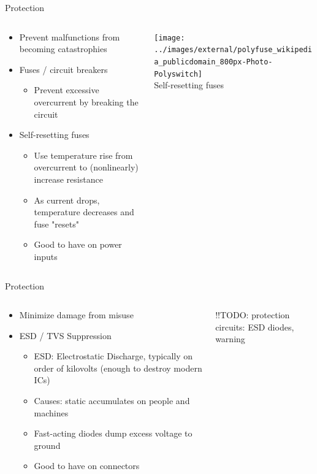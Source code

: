 \documentclass{beamer}
\begin{document}
\begin{frame}{Protection}
  \begin{columns}[T]
    \begin{column}{.6\textwidth}
      \begin{itemize}
        \item Prevent malfunctions from becoming catastrophies
        \item Fuses / circuit breakers
        \begin{itemize}
          \item Prevent excessive overcurrent by breaking the circuit
        \end{itemize}
        \item Self-resetting fuses
        \begin{itemize}
          \item Use temperature rise from overcurrent to (nonlinearly) increase resistance
          \item As current drops, temperature decreases and fuse "resets"
          \item Good to have on power inputs
        \end{itemize}
      \end{itemize}
    \end{column}

    \begin{column}{0.4\textwidth} \centering
      \texttt{[image: ../images/external/polyfuse\_wikipedia\_publicdomain\_800px-Photo-Polyswitch]} \\
      Self-resetting fuses \\
    \end{column}
  \end{columns}
\end{frame}

\begin{frame}{Protection}
  \begin{columns}[T]
    \begin{column}{.6\textwidth}
      \begin{itemize}
        \item Minimize damage from misuse
        \item ESD / TVS Suppression
        \begin{itemize}
          \item ESD: Electrostatic Discharge, typically on order of kilovolts (enough to destroy modern ICs)
          \item Causes: static accumulates on people and machines
          \item Fast-acting diodes dump excess voltage to ground
          \item Good to have on connectors
        \end{itemize}
      \end{itemize}
    \end{column}

    \begin{column}{0.4\textwidth}
      !!TODO: protection circuits: ESD diodes, warning
    \end{column}
  \end{columns}
\end{frame}
\end{document}
